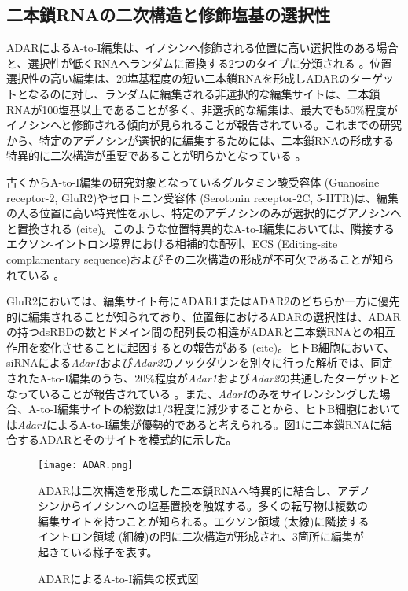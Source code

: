 \subsection{二本鎖RNAの二次構造と修飾塩基の選択性}
ADARによるA-to-I編集は、イノシンへ修飾される位置に高い選択性のある場合と、選択性が低くRNAへランダムに置換する2つのタイプに分類される \citep{Nis10}。位置選択性の高い編集は、20塩基程度の短い二本鎖RNAを形成しADARのターゲットとなるのに対し、ランダムに編集される非選択的な編集サイトは、二本鎖RNAが100塩基以上であることが多く、非選択的な編集は、最大でも50\%程度がイノシンへと修飾される傾向が見られることが報告されている。これまでの研究から、特定のアデノシンが選択的に編集するためには、二本鎖RNAの形成する特異的に二次構造が重要であることが明らかとなっている \citep{LehBas9908}。
\par
古くからA-to-I編集の研究対象となっているグルタミン酸受容体 (Guanosine receptor-2, GluR2)やセロトニン受容体 (Serotonin receptor-2C, 5-HTR)は、編集の入る位置に高い特異性を示し、特定のアデノシンのみが選択的にグアノシンへと置換される (cite)。このような位置特異的なA-to-I編集においては、隣接するエクソン-イントロン境界における相補的な配列、ECS (Editing-site complamentary sequence)およびその二次構造の形成が不可欠であることが知られている \citep{HigSinKoh9312}。
\par
GluR2においては、編集サイト毎にADAR1またはADAR2のどちらか一方に優先的に編集されることが知られており、位置毎におけるADARの選択性は、ADARの持つdsRBDの数とドメイン間の配列長の相違がADARと二本鎖RNAとの相互作用を変化させることに起因するとの報告がある (cite)。ヒトB細胞において、siRNAによる\textit{Adar1}および\textit{Adar2}のノックダウンを別々に行った解析では、同定されたA-to-I編集のうち、20\%程度が\textit{Adar1}および\textit{Adar2}の共通したターゲットとなっていることが報告されている \citep{Wang:2013aa}。また、\textit{Adar1}のみをサイレンシングした場合、A-to-I編集サイトの総数は1/3程度に減少することから、ヒトB細胞においては\textit{Adar1}によるA-to-I編集が優勢的であると考えられる。図\ref{fig:ADAR}に二本鎖RNAに結合するADARとそのサイトを模式的に示した。

\begin{figure}[!h]
	\begin{center}
		\texttt{[image: ADAR.png]}
	\end{center}
	\caption{ADARによるA-to-I編集の模式図}
	\begin{flushleft}
		\small{ADARは二次構造を形成した二本鎖RNAへ特異的に結合し、アデノシンからイノシンへの塩基置換を触媒する。多くの転写物は複数の編集サイトを持つことが知られる。エクソン領域 (太線)に隣接するイントロン領域 (細線)の間に二次構造が形成され、3箇所に編集が起きている様子を表す。}
	\end{flushleft}
	\label{fig:ADAR}
\end{figure}

